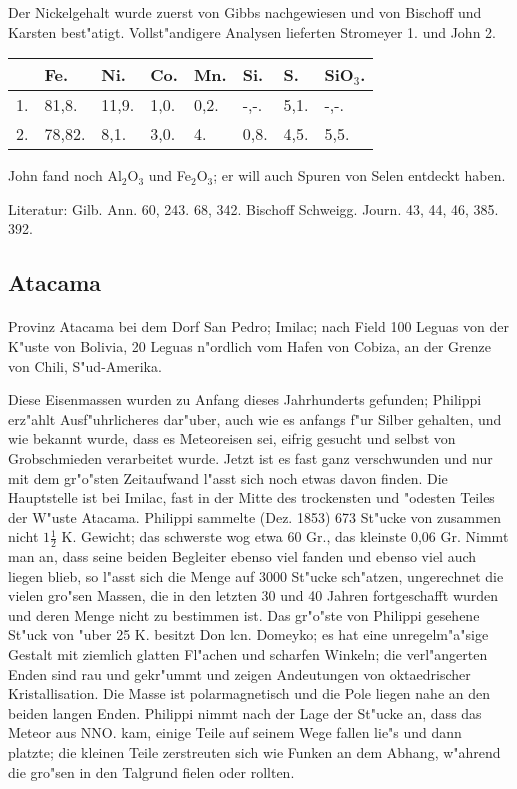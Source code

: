 \documentclass[a4paper, 11pt, oneside]{article}
\begin{document}
Der Nickelgehalt wurde zuerst von Gibbs nachgewiesen und von Bischoff und Karsten best"atigt. Vollst"andigere Analysen lieferten Stromeyer 1. und John 2.
\begin{table}[H]
    \centering
    \begin{tabular}{l l l l l l l l}
         & Fe. & Ni. & Co. & Mn. & Si. & S. & SiO$_{3}$. \\ \hline
        1. & 81,8. & 11,9. & 1,0. & 0,2. & -,-. & 5,1. & -,-. \\
        2. & 78,82. & 8,1. & 3,0. & 4. & 0,8. & 4,5. & 5,5. \\
    \end{tabular}
\end{table}

John fand noch Al$_{2}$O$_{3}$ und Fe$_{2}$O$_{3}$; er will auch Spuren von Selen entdeckt haben.

\footnotesize
Literatur: Gilb. Ann. 60, 243. 68, 342. Bischoff Schweigg. Journ. 43, 44, 46, 385. 392.

\subsection{Atacama}
\normalsize
\paragraph{}
Provinz Atacama bei dem Dorf San Pedro; Imilac; nach Field 100 Leguas von der K"uste von Bolivia, 20 Leguas n"ordlich vom Hafen von Cobiza, an der Grenze von Chili, S"ud-Amerika.

Diese Eisenmassen wurden zu Anfang dieses Jahrhunderts gefunden; Philippi erz"ahlt Ausf"uhrlicheres dar"uber, auch wie es anfangs f"ur Silber gehalten, und wie bekannt wurde, dass es Meteoreisen sei, eifrig gesucht und selbst von Grobschmieden verarbeitet wurde. Jetzt ist es fast ganz verschwunden und nur mit dem gr"o"sten Zeitaufwand l"asst sich noch etwas davon finden. Die Hauptstelle ist bei Imilac, fast in der Mitte des trockensten und "odesten Teiles der W"uste Atacama. Philippi sammelte (Dez. 1853) 673 St"ucke von zusammen nicht $1\frac{1}{2}$ K. Gewicht; das schwerste wog etwa 60 Gr., das kleinste 0,06 Gr. Nimmt man an, dass seine beiden Begleiter ebenso viel fanden und ebenso viel auch liegen blieb, so l"asst sich die Menge auf 3000 St"ucke sch"atzen, ungerechnet die vielen gro"sen Massen, die in den letzten 30 und 40 Jahren fortgeschafft wurden und deren Menge nicht zu bestimmen ist. Das gr"o"ste von Philippi gesehene St"uck von "uber 25 K. besitzt Don lcn. Domeyko; es hat eine unregelm"a"sige Gestalt mit ziemlich glatten Fl"achen und scharfen Winkeln; die verl"angerten Enden sind rau und gekr"ummt und zeigen Andeutungen von oktaedrischer Kristallisation. Die Masse ist polarmagnetisch und die Pole liegen nahe an den beiden langen Enden. Philippi nimmt nach der Lage der St"ucke an, dass das Meteor aus NNO. kam, einige Teile auf seinem Wege fallen lie"s und dann platzte; die kleinen Teile zerstreuten sich wie Funken an dem Abhang, w"ahrend die gro"sen in den Talgrund fielen oder rollten.
\end{document}
